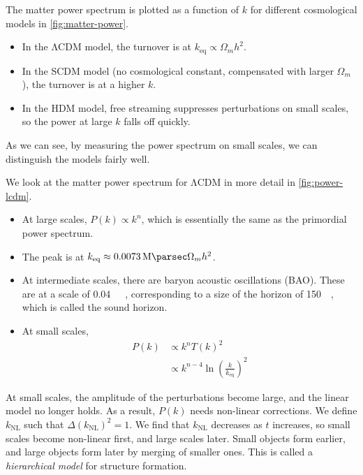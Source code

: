 The matter power spectrum is plotted as a function of $k$ for different cosmological models in \cref{fig:matter-power}.
\begin{itemize}
	\item In the ΛCDM model, the turnover is at $k_\text{eq} \propto \Omega_m h^2$.
	\item In the SCDM model (no cosmological constant, compensated with larger $\Omega_m$), the turnover is at a higher $k$.
	\item In the HDM model, free streaming suppresses perturbations on small scales, so the power at large $k$ falls off quickly.
\end{itemize}
As we can see, by measuring the power spectrum on small scales, we can distinguish the models fairly well.


We look at the matter power spectrum for ΛCDM in more detail in \cref{fig:power-lcdm}. 


\begin{itemize}
	\item At large scales, $P(k) \propto k^n$, which is essentially the same as the primordial power spectrum.
	\item The peak is at $k_\text{eq} \approx \SI{0.0073}{\per\mega\parsec} \Omega_m h^2$.
	\item At intermediate scales, there are baryon acoustic oscillations (BAO). These are at a scale of \SI{0.04}{\per\mega\parsec}, corresponding to a size of the horizon of \SI{150}{\mega\parsec}, which is called the sound horizon.
	\item At small scales,
	\begin{align*}
		P(k)
		&\propto k^n T(k)^2\\
		&\propto k^{n-4} \ln
		\left( \frac{k}{k_\text{eq}} \right)^2
	\end{align*}
\end{itemize}
At small scales, the amplitude of the perturbations become large, and the linear model no longer holds. As a result, $P(k)$ needs non-linear corrections. We define $k_\text{NL}$ such that $\Delta(k_\text{NL})^2 = 1$. We find that $k_\text{NL}$ decreases as $t$ increases, so small scales become non-linear first, and large scales later. Small objects form earlier, and large objects form later by merging of smaller ones. This is called a \emph{hierarchical model} for structure formation.
 
